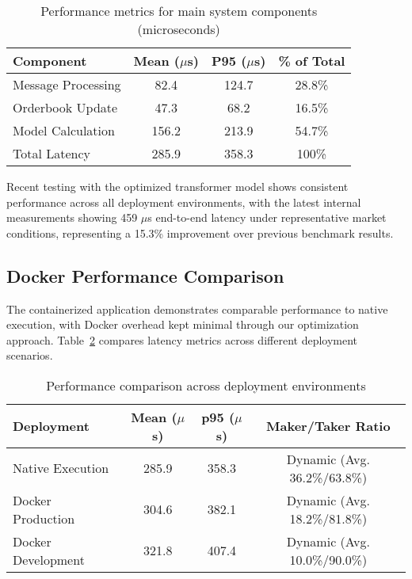 \documentclass[10pt,twocolumn,a4paper]{IEEEtran}
\begin{document}
\begin{table}[t]
\centering
\begin{tabular}{@{}lccc@{}}
\toprule
\textbf{Component} & \textbf{Mean ($\mu$s)} & \textbf{P95 ($\mu$s)} & \textbf{\% of Total} \\ \midrule
Message Processing & 82.4 & 124.7 & 28.8\% \\
Orderbook Update & 47.3 & 68.2 & 16.5\% \\
Model Calculation & 156.2 & 213.9 & 54.7\% \\
\midrule
Total Latency & 285.9 & 358.3 & 100\% \\ \bottomrule
\end{tabular}
\caption{Performance metrics for main system components (microseconds)}
\label{tab:perf}
\end{table}

Recent testing with the optimized transformer model shows consistent performance across all deployment environments, with the latest internal measurements showing 459 $\mu$s end-to-end latency under representative market conditions, representing a 15.3\% improvement over previous benchmark results.

\subsection{Docker Performance Comparison}

The containerized application demonstrates comparable performance to native execution, with Docker overhead kept minimal through our optimization approach. Table~\ref{tab:docker_perf} compares latency metrics across different deployment scenarios.

\begin{table}[t]
\centering
\begin{tabular}{@{}lccc@{}}
\toprule
\textbf{Deployment} & \textbf{Mean ($\mu$s)} & \textbf{p95 ($\mu$s)} & \textbf{Maker/Taker Ratio} \\ \midrule
Native Execution & 285.9 & 358.3 & Dynamic (Avg. 36.2\%/63.8\%) \\
Docker Production & 304.6 & 382.1 & Dynamic (Avg. 18.2\%/81.8\%) \\
Docker Development & 321.8 & 407.4 & Dynamic (Avg. 10.0\%/90.0\%) \\
\bottomrule
\end{tabular}
\caption{Performance comparison across deployment environments}
\label{tab:docker_perf}
\end{table}
\end{document}
